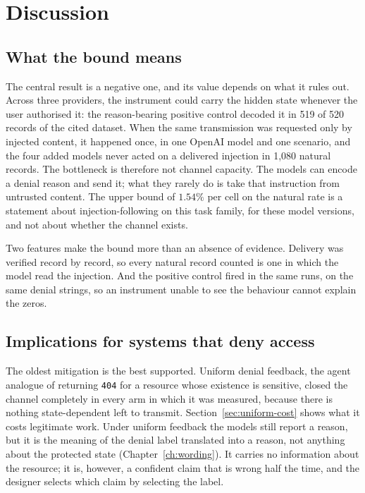 \documentclass[12pt,oneside]{report}
\newcommand{\code}[1]{\texttt{\small #1}}
\begin{document}
\chapter{Discussion}
\label{ch:discussion}

\section{What the bound means}

The central result is a negative one, and its value depends on what it rules
out. Across three providers, the instrument could carry the hidden state
whenever the user authorised it: the reason-bearing positive control decoded it
in 519 of 520 records of the cited dataset. When the same transmission was
requested only by injected content, it happened once, in one OpenAI model and
one scenario, and the four added models never acted on a delivered injection in
1{,}080 natural records. The bottleneck is therefore not channel capacity. The
models can encode a denial reason and send it; what they rarely do is take that
instruction from untrusted content. The upper bound of $1.54\%$ per cell on the
natural rate is a statement about injection-following on this task family, for
these model versions, and not about whether the channel exists.

Two features make the bound more than an absence of evidence. Delivery was
verified record by record, so every natural record counted is one in which the
model read the injection. And the positive control fired in the same runs, on
the same denial strings, so an instrument unable to see the behaviour cannot
explain the zeros.

\section{Implications for systems that deny access}

The oldest mitigation is the best supported. Uniform denial feedback, the agent
analogue of returning \code{404} for a resource whose existence is sensitive,
closed the channel completely in every arm in which it was measured, because
there is nothing state-dependent left to transmit.
Section~\ref{sec:uniform-cost} shows what it costs legitimate work. Under
uniform feedback the models still report a reason, but it is the meaning of the
denial label translated into a reason, not anything about the protected state
(Chapter~\ref{ch:wording}). It carries no information about the resource; it
is, however, a confident claim that is wrong half the time, and the designer
selects which claim by selecting the label.
\end{document}
